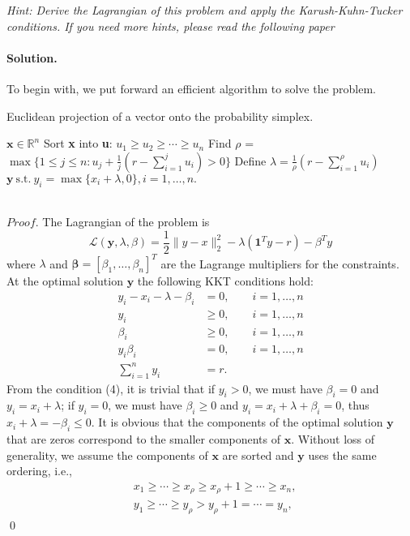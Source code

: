\documentclass[a4paper]{article}
\newenvironment{solution}
{\color{blue} \paragraph{Solution.\\}}
{\newline \qed}
\begin{document}
\noindent\emph{Hint: Derive the Lagrangian of this problem and apply the Karush-Kuhn-Tucker conditions. If you need more hints, please read the following paper \cite{Wang2013}}
\begin{solution}
	To begin with, we put forward an efficient algorithm to solve the problem.
\begin{algorithm}[!h]
	\caption{Euclidean projection of a vector onto the probability simplex.}
	\begin{algorithmic} \color{blue}
		\REQUIRE $\textbf{x} \in \mathbb{R}^n$		
		\STATE Sort \textbf{x} into \textbf{u}: $u_1 \geq u_2 \geq \cdots \geq u_n$
		\STATE Find $\rho$ = $\max\{1 \leq j \leq n: u_j+\frac{1}{j}(r - \sum_{i=1}^ju_i)>0\}$ 
		\STATE Define $\lambda=\frac{1}{\rho}(r - \sum_{i=1}^\rho u_i)$
		\ENSURE $\textbf{y}\ \mathrm{s.t.}\ y_i = \max\{x_i+\lambda, 0\},i=1,\dots ,n.$
	\end{algorithmic}
\end{algorithm}\\
$\textit{Proof.}$ The Lagrangian of the problem is 
	$$\mathcal{L}(\mathbf{y},\lambda,\beta)=\frac{1}{2}\|y-x\|_2^2-\lambda(\mathbf{1}^Ty-r)-\beta^Ty$$ where $\lambda$ and $\mathbf{\beta}=[\beta_1,\dots,\beta_n]^T$ are the Lagrange multipliers for the constraints. At the optimal solution $\mathbf{y}$ the following KKT conditions hold:
\begin{align}
	y_i-x_i-\lambda-\beta_i &= 0,\qquad i = 1,\dots,n\\
	y_i & \geq 0,\qquad i = 1,\dots,n\\
	\beta_i &\geq 0,\qquad i = 1,\dots,n\\ 
	y_i\beta_i &= 0,\qquad i = 1,\dots,n\\
	\sum_{i=1}^ny_i &= r.
\end{align}
From the condition (4), it is trivial that if $y_i > 0$, we must have $\beta_i=0$ and $y_i=x_i+\lambda$; if $y_i = 0$, we must have $\beta_i \geq 0$ and $y_i=x_i+\lambda+\beta_i=0$, thus $x_i+\lambda=-\beta_i \leq 0$. It is obvious that the components of the optimal solution $\textbf{y}$ that are zeros correspond to the smaller components of $\textbf{x}$. Without loss of generality, we assume the components of $\textbf{x}$ are sorted and $\textbf{y}$ uses the same ordering, i.e.,
\begin{equation}\nonumber
\begin{aligned}
	&x_1\geq \cdots \geq x_\rho \geq x_\rho+1 \geq \cdots \geq x_n,
	\\&y_1\geq \cdots \geq y_\rho > y_\rho+1 = \cdots = y_n,

\end{aligned}
\end{equation}
\end{solution}
\end{document}
